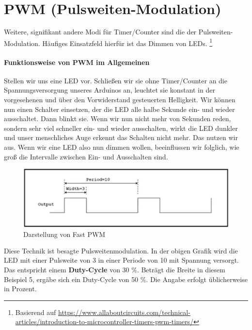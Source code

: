 \documentclass[11pt,a4paper]{scrartcl}
\begin{document}
\section{PWM (Pulsweiten-Modulation)}
Weitere, signifikant andere Modi für Timer/Counter sind die der Pulsweiten-Modulation. Häufiges Einsatzfeld hierfür ist das Dimmen von LEDs. \footnote{Basierend auf \href{www.allaboutcircuits.com}{https://www.allaboutcircuits.com/technical-articles/introduction-to-microcontroller-timers-pwm-timers/}}
\paragraph{Funktionsweise von PWM im Allgemeinen} Stellen wir uns eine LED vor. Schließen wir sie ohne Timer/Counter an die Spannungsversorgung unseres Arduinos an, leuchtet sie konstant in der vorgesehenen und über den Vorwiderstand gesteuerten Helligkeit. Wir können nun einen Schalter einsetzen, der die LED alle halbe Sekunde ein- und wieder ausschaltet. Dann blinkt sie. Wenn wir nun nicht mehr von Sekunden reden, sondern sehr viel schneller ein- und wieder ausschalten, wirkt die LED dunkler und unser menschliches Auge erkennt das Schalten nicht mehr. Das nutzen wir aus. Wenn wir eine LED also nun dimmen wollen, beeinflussen wir folglich, wie groß die Intervalle zwischen Ein- und Ausschalten sind.
\begin{figure}[h!]
\centering
\includegraphics[scale=0.7]{pwm.png}
\caption{Darstellung von Fast PWM}
\end{figure}
Diese Technik ist besagte Pulsweitenmodulation. In der obigen Grafik wird die LED mit einer Pulsweite von 3 in einer Periode von 10 mit Spannung versorgt. Das entspricht einem \textbf{Duty-Cycle} von 30 \%. Beträgt die Breite in diesem Beispiel 5, ergäbe sich ein Duty-Cycle von 50 \%. Die Angabe erfolgt üblicherweise in Prozent.
\end{document}
